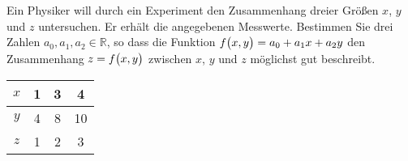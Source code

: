 \documentclass{scrreprt}
\begin{document}
\begin{minipage}{.8\textwidth}
  Ein Physiker will durch ein Experiment den Zusammenhang dreier Größen $x$, $y$
  und $z$ untersuchen.
  Er erhält die angegebenen Messwerte.
  Bestimmen Sie drei Zahlen $a_0, a_1, a_2 \in \mathbb{R}$, so dass die Funktion
  $f\qty\big(x, y) = a_0 + a_1x + a_2y$ den Zusammenhang $z = f\qty\big(x, y)$
  zwischen $x$, $y$ und $z$ möglichst gut beschreibt.
\end{minipage}
\begin{minipage}{.2\textwidth}
  \begin{tabular}{|c|ccc|}
    \hline
    $x$ & 1 & 3 & 4  \\
    \hline
    $y$ & 4 & 8 & 10 \\
    \hline
    $z$ & 1 & 2 & 3  \\
    \hline
  \end{tabular}
\end{minipage}
\end{document}
